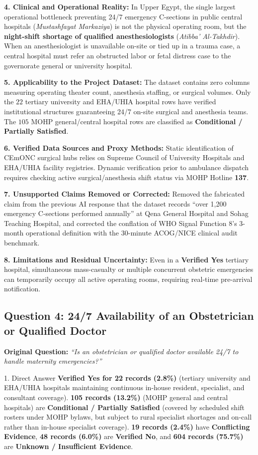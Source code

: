 \documentclass[10pt,a4paper]{article}
\begin{document}
\textbf{4. Clinical and Operational Reality:}
In Upper Egypt, the single largest operational bottleneck preventing 24/7 emergency C-sections in public central hospitals (\textit{Mustashfayat Markaziya}) is not the physical operating room, but the \textbf{night-shift shortage of qualified anesthesiologists} (\textit{Atibba' Al-Takhdir}). When an anesthesiologist is unavailable on-site or tied up in a trauma case, a central hospital must refer an obstructed labor or fetal distress case to the governorate general or university hospital.

\textbf{5. Applicability to the Project Dataset:}
The dataset contains zero columns measuring operating theater count, anesthesia staffing, or surgical volumes. Only the $22$ tertiary university and EHA/UHIA hospital rows have verified institutional structures guaranteeing 24/7 on-site surgical and anesthesia teams. The $105$ MOHP general/central hospital rows are classified as \textbf{Conditional / Partially Satisfied}.

\textbf{6. Verified Data Sources and Proxy Methods:}
Static identification of CEmONC surgical hubs relies on Supreme Council of University Hospitals and EHA/UHIA facility registries. Dynamic verification prior to ambulance dispatch requires checking active surgical/anesthesia shift status via MOHP Hotline \textbf{137}.

\textbf{7. Unsupported Claims Removed or Corrected:}
Removed the fabricated claim from the previous AI response that the dataset records ``over 1,200 emergency C-sections performed annually'' at Qena General Hospital and Sohag Teaching Hospital, and corrected the conflation of WHO Signal Function 8's 3-month operational definition with the 30-minute ACOG/NICE clinical audit benchmark.

\textbf{8. Limitations and Residual Uncertainty:}
Even in a \textbf{Verified Yes} tertiary hospital, simultaneous mass-casualty or multiple concurrent obstetric emergencies can temporarily occupy all active operating rooms, requiring real-time pre-arrival notification.

\subsection{Question 4: 24/7 Availability of an Obstetrician or Qualified Doctor}
\textbf{Original Question:} \textit{``Is an obstetrician or qualified doctor available 24/7 to handle maternity emergencies?''}

\begin{auditbox}{1. Direct Answer}
\textbf{Verified Yes for 22 records (2.8\%)} (tertiary university and EHA/UHIA hospitals maintaining continuous in-house resident, specialist, and consultant coverage). \textbf{105 records (13.2\%)} (MOHP general and central hospitals) are \textbf{Conditional / Partially Satisfied} (covered by scheduled shift rosters under MOHP bylaws, but subject to rural specialist shortages and on-call rather than in-house specialist coverage). \textbf{19 records (2.4\%)} have \textbf{Conflicting Evidence}, \textbf{48 records (6.0\%)} are \textbf{Verified No}, and \textbf{604 records (75.7\%)} are \textbf{Unknown / Insufficient Evidence}.
\end{auditbox}
\end{document}
